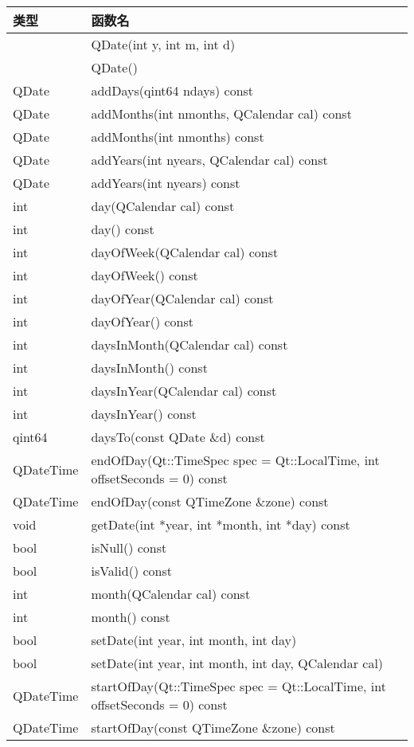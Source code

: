 \begin{longtable}{|l|l|}
\hline
类型	&函数名\\
\hline
&QDate(int y, int m, int d)\\
\hline
&QDate()\\
\hline
QDate&	addDays(qint64 ndays) const\\
\hline
QDate&	addMonths(int nmonths, QCalendar cal) const\\
\hline
QDate&	addMonths(int nmonths) const\\
\hline
QDate&	addYears(int nyears, QCalendar cal) const\\
\hline
QDate&	addYears(int nyears) const\\
\hline
int&	day(QCalendar cal) const\\
\hline
int&	day() const\\
\hline
int&	dayOfWeek(QCalendar cal) const\\
\hline
int&	dayOfWeek() const\\
\hline
int&	dayOfYear(QCalendar cal) const\\
\hline
int&	dayOfYear() const\\
\hline
int&	daysInMonth(QCalendar cal) const\\
\hline
int&	daysInMonth() const\\
\hline
int&	daysInYear(QCalendar cal) const\\
\hline
int&	daysInYear() const\\
\hline
qint64&	daysTo(const QDate \&d) const\\
\hline
QDateTime&	endOfDay(Qt::TimeSpec spec = Qt::LocalTime, int offsetSeconds = 0) const\\
\hline
QDateTime&	endOfDay(const QTimeZone \&zone) const\\
\hline
void&	getDate(int *year, int *month, int *day) const\\
\hline
bool&	isNull() const\\
\hline
bool&	isValid() const\\
\hline
int&	month(QCalendar cal) const\\
\hline
int&	month() const\\
\hline
bool&	setDate(int year, int month, int day)\\
\hline
bool&	setDate(int year, int month, int day, QCalendar cal)\\
\hline
QDateTime&	startOfDay(Qt::TimeSpec spec = Qt::LocalTime, int offsetSeconds = 0) const\\
\hline
QDateTime&	startOfDay(const QTimeZone \&zone) const\\

\end{longtable}
